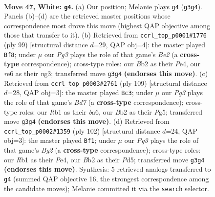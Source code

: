 \documentclass[11pt]{article}
\begin{document}
\clearpage

\begin{figure}[p]\centering
\begin{subfigure}{0.46\textwidth}\centering
\resizebox{\linewidth}{!}{%
\newchessgame
\chessboard[
  setfen={7k/3n4/4r3/8/p1p5/P1P2KPp/1BP4P/1R6 w - - 11 47},
  showmover=false,
  pgfstyle=straightmove, color=movearrow, markmove={g3-g4}
]}
\caption{}
\end{subfigure}\hfill
\begin{subfigure}{0.46\textwidth}\centering
\resizebox{\linewidth}{!}{%
\newchessgame
\chessboard[
  setfen={8/4b3/4k3/3p2p1/1p1Pp1P1/1P2P1N1/3K4/8 b - - 9 50},
  showmover=false,
  pgfstyle=straightmove, color=movearrow, markmove={e7-f8}
]}
\caption{}
\end{subfigure}
\\[4pt]
\begin{subfigure}{0.46\textwidth}\centering
\resizebox{\linewidth}{!}{%
\newchessgame
\chessboard[
  setfen={8/4k3/B4p1p/3K1Pp1/1p4P1/7P/2Pb4/8 b - - 13 55},
  showmover=false,
  pgfstyle=straightmove, color=movearrow, markmove={d2-c3}
]}
\caption{}
\end{subfigure}\hfill
\begin{subfigure}{0.46\textwidth}\centering
\resizebox{\linewidth}{!}{%
\newchessgame
\chessboard[
  setfen={6k1/6p1/8/p2Pp2b/Pp2P2P/1P5P/6B1/6K1 w - - 0 52},
  showmover=false,
  pgfstyle=straightmove, color=movearrow, markmove={g2-f1}
]}
\caption{}
\end{subfigure}
\caption{\textbf{Move 47, White: \texttt{g4}.} (a) Our position; Melanie plays \texttt{g4} (\texttt{g3g4}). Panels (b)--(d) are the retrieved master positions whose correspondence most drove this move (highest QAP objective among those that transfer to it). (b) Retrieved from \texttt{ccrl\_top\_p0001\#1776} (ply 99) [structural distance $d$=29, QAP obj=4]: the master played \texttt{Bf8}; under $\mu$ our \emph{Pg3} plays the role of that game's \emph{Be2} (a \textbf{cross-type} correspondence); cross-type roles: our \emph{B}b2 as their \emph{P}e4, our \emph{r}e6 as their \emph{n}g3; transferred move \texttt{g3g4} \textbf{(endorses this move)}. (c) Retrieved from \texttt{ccrl\_top\_p0003\#2761} (ply 109) [structural distance $d$=28, QAP obj=3]: the master played \texttt{Bc3}; under $\mu$ our \emph{Pg3} plays the role of that game's \emph{Bd7} (a \textbf{cross-type} correspondence); cross-type roles: our \emph{R}b1 as their \emph{b}a6, our \emph{B}b2 as their \emph{P}g5; transferred move \texttt{g3g4} \textbf{(endorses this move)}. (d) Retrieved from \texttt{ccrl\_top\_p0002\#1359} (ply 102) [structural distance $d$=24, QAP obj=3]: the master played \texttt{Bf1}; under $\mu$ our \emph{Pg3} plays the role of that game's \emph{Bg2} (a \textbf{cross-type} correspondence); cross-type roles: our \emph{R}b1 as their \emph{P}e4, our \emph{B}b2 as their \emph{P}d5; transferred move \texttt{g3g4} \textbf{(endorses this move)}. Synthesis: 5 retrieved analogs transferred to \texttt{g4} (summed QAP objective 16, the strongest correspondence among the candidate moves); Melanie committed it via the \texttt{search} selector.}
\label{fig:thought-m92}
\end{figure}
\end{document}
